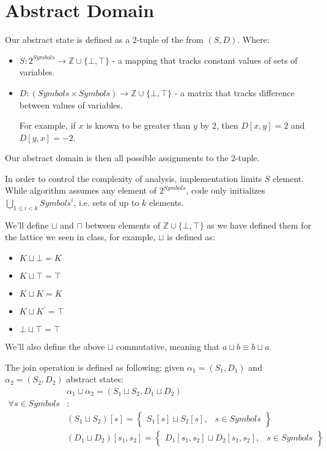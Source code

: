 \section*{Abstract Domain}
Our abstract state is defined as a 2-tuple of the from $(S,D)$. Where:
\begin{itemize}
	\item $S: 2^{Symbols} \rightarrow \mathbb{Z}\cup \{\bot, \top\}$ - a mapping that tracks constant values of sets of variables.
	\item $D: (Symbols \times Symbols )\rightarrow \mathbb{Z}\cup \{\bot, \top\}$ - a matrix that tracks difference between values of variables.
	
	For example, if $x$ is known to be greater than $y$ by 2, then $D[x,y] = 2$ and $D[y,x] = -2$.

\end{itemize}
Our abstract domain is then all possible assignments to the 2-tuple.

In order to control the complexity of analysis, implementation limits $S$ element. While algorithm assumes any element of $2^{Symbols}$, code only initializes $\bigcup_{1\le i < k} {Symbols}^i$, i.e. sets of up to $k$ elements.

We'll define $\sqcup$ and $\sqcap$ between elements of $\mathbb{Z}\cup \{\bot, \top\}$ as we have defined them for the lattice we seen in class, for example, $\sqcup$ is defined as:
\begin{itemize}
	\item $K \sqcup \bot = K$
	\item $K \sqcup \top = \top$
	\item $K \sqcup K = K$
	\item $K \sqcup K^\prime = \top$
	\item $\bot \sqcup \top = \top$
\end{itemize}
We'll also define the above $\sqcup$ commutative, meaning that $a\sqcup b \equiv b \sqcup a$.

The join operation is defined as following: given $\alpha_1=(S_1, D_1)$ and $\alpha_2=(S_2,D_2)$ abstract states:
\begin{align*}
&\alpha_1\sqcup\alpha_2=(S_1\sqcup S_2, D_1 \sqcup D_2) \\
\forall s \in Symbols&:  \\
&(S_1\sqcup S_2)[s] = \left.
	\begin{cases}
		S_1[s]\sqcup S_2[s], & s \in Symbols
	\end{cases}
\right\} \\
&(D_1\sqcup D_2)[s_1, s_2] = \left.
	\begin{cases}
		D_1[s_1, s_2]\sqcup D_2[s_1, s_2], & s \in Symbols
	\end{cases}
\right\}
\end{align*}

